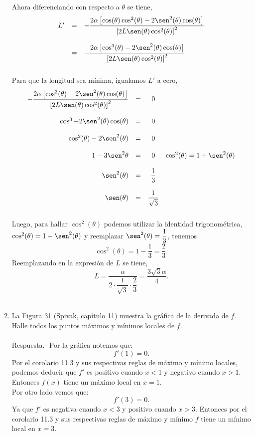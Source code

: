 \begin{enumerate}[\bfseries 1.]
	Ahora diferenciando con respecto a $\theta$ se tiene,
	$$\begin{array}{rcl}
	    L'&=&-\dfrac{2\alpha\left[\cos(\theta)\cos^2(\theta)-2\sen^2(\theta)\cos(\theta)\right]}{\left[2L\sen(\theta)\cos^2(\theta)\right]^2}\\\\
	      &=&-\dfrac{2\alpha\left[\cos^3(\theta)-2\sen^2(\theta)\cos(\theta)\right]}{\left[2L\sen(\theta)\cos^2(\theta)\right]^2}\\\\
	\end{array}$$
	Para que la longitud sea mínima, igualamos $L'$ a cero,
	$$\begin{array}{rccl}
	    -\dfrac{2\alpha\left[\cos^3(\theta)-2\sen^2(\theta)\cos(\theta)\right]}{\left[2L\sen(\theta)\cos^2(\theta)\right]^2}&=&0&\\\\
	    \cos^3-2\sen^2(\theta)\cos(\theta)&=&0&\\\\
	    \cos^2(\theta)-2\sen^2(\theta)&=&0&\\\\\
							    1-3\sen^2\theta&=&0&\cos^2(\theta)=1+\sen^2(\theta)\\\\
							    \sen^2(\theta)&=&\dfrac{1}{3}&\\\\
							    \sen(\theta)&=&\dfrac{1}{\sqrt{3}}&\\\\
	\end{array}$$
	Luego, para hallar $\cos^2(\theta)$ podemos utilizar la identidad trigonométrica, $\cos^2(\theta)=1-\sen^2(\theta)$ y reemplazar $\sen^2(\theta)=\dfrac{1}{3}$, tenemos
	$$\cos^2(\theta)=1-\dfrac{1}{3}=\dfrac{2}{3}.$$
	Reemplazando en la expresión de $L$ se tiene,
	$$L=\dfrac{\alpha}{2\cdot\dfrac{1}{\sqrt{3}}\cdot\dfrac{2}{3}}=\dfrac{3\sqrt{3}\alpha}{4}.$$\\

    \item La Figura 31 (Spivak, capítulo 11) muestra la gráfica de la derivada de $f$. Halle todos los puntos máximos y mínimos locales de $f$.\\\\
	Respuesta.-\; Por la gráfica notemos que:
	$$f'(1)=0.$$
	Por el corolario 11.3 y sus respectivas reglas de máximo y mínimo locales, podemos deducir que $f'$ es positivo cuando $x<1$ y negativo cuando $x>1$. Entonces $f(x)$ tiene un máximo local en $x=1$.\\
	Por otro lado vemos que:
	$$f'(3)=0.$$
	Ya que $f'$ es negativa cuando $x<3$ y positivo cuando $x>3$. Entonces por el corolario 11.3 y sus respectivas reglas de máximo y mínimo $f$ tiene un mínimo local en $x=3$.\\\\


\end{enumerate}
